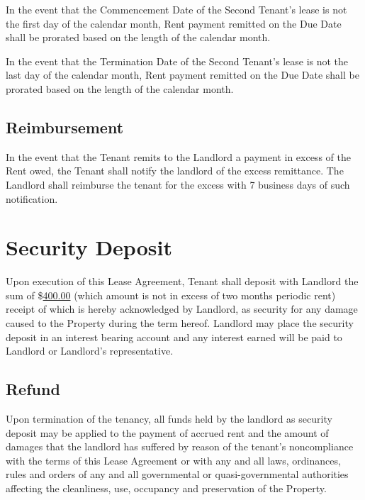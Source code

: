 \documentclass{amsart}
\begin{document}
In the event that the Commencement Date of the Second Tenant's lease is not the
first day of the calendar month, Rent payment remitted on the Due Date shall be
prorated based on the length of the calendar month.

In the event that the Termination Date of the Second Tenant's lease is not the
last day of the calendar month, Rent payment remitted on the Due Date shall be
prorated based on the length of the calendar month.
\subsection{Reimbursement}
In the event that the Tenant remits to the Landlord a payment in excess of the
Rent owed, the Tenant shall notify the landlord of the excess remittance. The
Landlord shall reimburse the tenant for the excess with 7 business days of such
notification.
\section{Security Deposit}
Upon execution of this Lease Agreement, Tenant shall deposit with Landlord the
sum of \$\underline{400.00} (which amount is not in excess of two months
periodic rent) receipt of which is hereby acknowledged by Landlord, as security
for any damage caused to the Property during the term hereof. Landlord may place
the security deposit in an interest bearing account and any interest earned will
be paid to Landlord or Landlord's representative.
\subsection{Refund}
Upon termination of the tenancy, all funds held by the landlord as security
deposit may be applied to the payment of accrued rent and the amount of damages
that the landlord has suffered by reason of the tenant's noncompliance with the
terms of this Lease Agreement or with any and all laws, ordinances, rules and
orders of any and all governmental or quasi-governmental authorities affecting
the cleanliness, use, occupancy and preservation of the Property.
\end{document}
